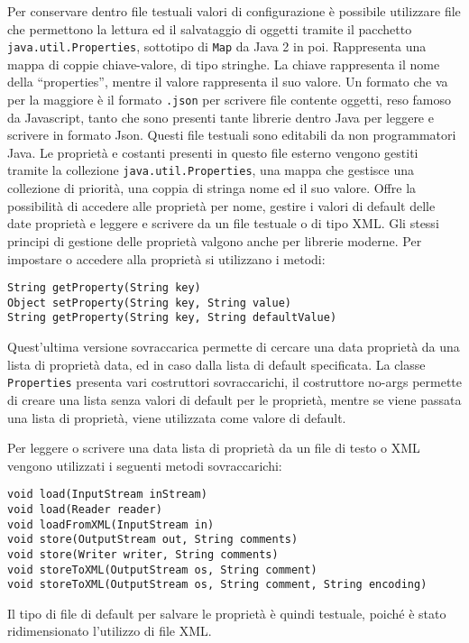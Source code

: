 \documentclass{article}
\numberwithin{equation}{subsection}
\begin{document}
Per conservare dentro file testuali valori di configurazione è possibile utilizzare file che permettono la lettura ed il salvataggio di oggetti tramite il pacchetto \verb|java.util.Properties|, 
sottotipo di \verb|Map| da Java 2 in poi. Rappresenta una mappa di coppie chiave-valore, di tipo stringhe. La chiave rappresenta il nome della ``properties'', mentre il valore 
rappresenta il suo valore. 
Un formato che va per la maggiore è il formato \verb|.json| per scrivere file contente oggetti, reso famoso da Javascript, tanto che sono presenti tante librerie dentro 
Java per leggere e scrivere in formato Json. 
Questi file testuali sono editabili da non programmatori Java. 
Le proprietà e costanti presenti in questo file esterno vengono gestiti tramite la collezione \verb|java.util.Properties|, una mappa che gestisce una collezione di priorità, una coppia di 
stringa nome ed il suo valore. Offre la possibilità di accedere alle proprietà per nome, gestire i valori di default delle date proprietà e leggere e scrivere da un file testuale o 
di tipo XML. Gli stessi principi di gestione delle proprietà valgono anche per librerie moderne. 
Per impostare o accedere alla proprietà si utilizzano i metodi:
\begin{verbatim}
String getProperty(String key)
Object setProperty(String key, String value)
String getProperty(String key, String defaultValue)
\end{verbatim}
Quest'ultima versione sovraccarica permette di cercare una data proprietà da una lista di proprietà data, ed in caso dalla lista di default specificata. 
La classe \verb|Properties| presenta vari costruttori sovraccarichi, il costruttore no-args permette di creare una lista senza valori di default per le proprietà, mentre se viene passata 
una lista di proprietà, viene utilizzata come valore di default. 

Per leggere o scrivere una data lista di proprietà da un file di testo o XML vengono utilizzati i seguenti metodi sovraccarichi:
\begin{verbatim}
void load(InputStream inStream)
void load(Reader reader)
void loadFromXML(InputStream in)
void store(OutputStream out, String comments)
void store(Writer writer, String comments)
void storeToXML(OutputStream os, String comment)
void storeToXML(OutputStream os, String comment, String encoding)
\end{verbatim}
Il tipo di file di default per salvare le proprietà è quindi testuale, poiché è stato ridimensionato l'utilizzo di file XML. 
\end{document}
